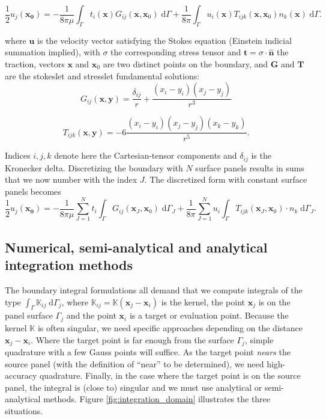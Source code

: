 \documentclass[smallcondensed,final]{svjour3}
\newcommand{\K}{\mathbb{K}}
\newcommand{\di}[1]{\text{d}#1}
\newcommand{\vect}[1]{\mathbf{#1}}
\newcommand{\nhat}{\hat{\mathbf{n}}}
\begin{document}
\begin{equation}
	\label{eqn:stokes_bem_12}
	\frac{1}{2}u_j(\vect{x_0}) = -\frac{1}{8\pi\mu}\int_{\Gamma} t_i(\vect{x})G_{ij}(\vect{x},\vect{x}_0)\;\di{\Gamma} + \frac{1}{8\pi} \int_{\Gamma} u_i(\vect{x})T_{ijk}(\vect{x},\vect{x}_0)n_k(\vect{x})\;\di{\Gamma}.
\end{equation}

\noindent where $\vect{u}$ is the velocity vector satisfying the Stokes equation (Einstein indicial summation implied), with $\sigma$ the corresponding stress tensor and $\vect{t} = \sigma\cdot\nhat$  the traction, vectors $\vect{x}$ and $\vect{x}_0$ are two distinct points on the boundary, and $\vect{G}$ and $\vect{T}$ are the stokeslet and stresslet fundamental solutions:
%
\begin{equation}
	\label{eqn:stokeslet}
	G_{ij}(\vect{x},\vect{y})  =  \frac{\delta_{ij}}{r} + \frac{(x_i-y_i)(x_j-y_j)}{r^{3}} 
\end{equation}

\begin{equation}
	\label{eqn:stresslet}
	T_{ijk}(\vect{x},\vect{y})  = - 6\frac{(x_i-y_i)(x_j-y_j)(x_k-y_k)}{r^{5}}.
\end{equation}

Indices $i, j, k$ denote here the Cartesian-tensor components and $\delta_{ij}$ is the Kronecker delta. Discretizing the boundary with $N$ surface panels results in sums that we now number with the index $J$.
The discretized form with constant surface panels becomes
%
\begin{equation}
	\label{eqn:stokes_bem_discretized}
	\frac{1}{2}u_j(\vect{x_0}) = -\frac{1}{8\pi\mu}\sum_{J=1}^{N}t_i\int_{\Gamma} G_{ij}(\vect{x}_J, \vect{x}_0)\;\di{\Gamma_J} + \frac{1}{8\pi} \sum_{J=1}^{N}u_i\int_{\Gamma} T_{ijk}(\vect{x}_J, \vect{x}_0)\cdot n_k\;\di{\Gamma_J}.
\end{equation}


\subsection{Numerical, semi-analytical and analytical integration methods}

The boundary integral formulations all demand that we compute integrals of the type $\int_{\Gamma} \K_{ij}\;\di{\Gamma_j}$, where $\K_{ij}=\K(\vect{x}_j-\vect{x}_i)$ is the kernel, the point $\vect{x}_j$ is on the panel surface $\Gamma_j$ and the point $\vect{x}_i$ is a target or evaluation point. Because the kernel $\K$ is often singular, we need specific approaches depending on the distance $\vect{x}_j-\vect{x}_i$. Where the target point is far enough from the surface $\Gamma_j$, simple quadrature with a few Gauss points will suffice. As the target point \emph{nears} the source panel (with the definition of ``near'' to be determined), we need high-accuracy quadrature. Finally, in the case where the target point is on the source panel, the integral is (close to) singular and we must use analytical or semi-analytical methods. Figure \ref{fig:integration_domain} illustrates the three situations.
\end{document}
